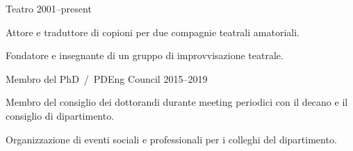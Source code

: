 
\begin{cventries}
    \cventry%
        {Teatro} %
        {} %
        {}%
        {2001--present} %
        {\begin{cvitems}
            \item {Attore e traduttore di copioni per due compagnie teatrali amatoriali.}
            \item {Fondatore e insegnante di un gruppo di improvvisazione teatrale.}
        \end{cvitems}}

    \cventry%
        {Membro del PhD~/~PDEng Council} %
        {} %
        {} %
        {2015--2019} %
        {\begin{cvitems}
            \item {Membro del consiglio dei dottorandi durante meeting periodici con il decano e il consiglio di dipartimento.}
            \item {Organizzazione di eventi sociali e professionali per i colleghi del dipartimento.}
        \end{cvitems}}

\end{cventries}
